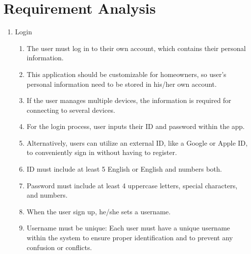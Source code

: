 \newpage
\section{\Large{Requirement Analysis}}
\begin{enumerate}[label=\arabic*.]
      \item {\large{Login}}\\

            \begin{enumerate}[label*={\arabic*.},ref=\theenumi.\arabic*]
                  \setlength{\itemindent}{0.5cm}
                  \item The user must log in to their own account, which contains their personal information.\\

                  \item This application should be customizable for homeowners, so user’s personal information need to be stored in his/her own account.\\

                  \item If the user manages multiple devices, the information is required for connecting to several devices.\\

                  \item For the login process, user inputs their ID and password within the app.\\

                  \item Alternatively, users can utilize an external ID, like a Google or Apple ID, to conveniently sign in without having to register.\\

                  \item ID must include at least 5 English or English and numbers both.\\

                  \item Password must include at least 4 uppercase letters, special characters, and numbers.\\

                  \item When the user sign up, he/she sets a username.\\

                  \item Username must be unique: Each user must have a unique username within the system to ensure proper identification and to prevent any confusion or conflicts.\\
            \end{enumerate}


\end{enumerate}
